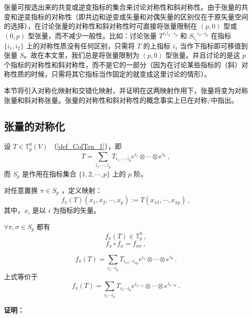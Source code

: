 


张量可按选出来的共变或逆变指标的集合来讨论对称性和斜对称性。由于张量的共变和逆变指标的对称性（即共边和逆变或矢量和对偶矢量的区别仅在于原矢量空间的选择），在讨论张量的对称性和斜对称性时可直接将张量限制在 $(p,0)$ 型或 $(0,p)$ 型张量，而不减少一般性。比如：讨论张量 $T^{i_1 i_2\cdots i_p}$ 和 ${S_{i_1}}^{i_2\cdots i_p}$ 在指标 $\{i_1,i_2\}$ 上的对称性质没有任何区别，只需将 $T$ 的上指标 $i_1$ 当作下指标即可移值到张量 $S$。故在本文里，我们总是将张量限制为 $(p,0)$ 型张量。并且讨论的是这 $p$ 个指标的对称性和斜对称性，而不是它的一部分（因为在讨论某些指标的（斜）对称性质的时候，只需将其它指标当作固定的就变成这里讨论的情形）。

本节将引入对称化映射和交错化映射，并证明在这两映射作用下，张量将变为对称张量和斜对称张量。张量的对称性和斜对称性的概念事实上已在对称/中指出。
\subsection{张量的对称化}
设 $T\in \mathbb{T}_p^0(V)$ （\autoref{def_CofTen_1}），即
\begin{equation}
T=\sum_{i_1,\cdots,i_p}T_{i_1,\cdots,i_p}e^{i_1}\otimes\cdots\otimes e^{i_p}~,
\end{equation}
而 $S_p$ 是作用在指标集合 $\{1,2,\cdots,p\}$ 上的 $p$ 阶。

对任意置换 $\pi\in S_p$ ，定义映射：
\begin{equation}\label{eq_SIofTe_1}
f_\pi(T)(x_1,x_2,\cdots,x_p):=T(x_{\pi1},\cdots,x_{\pi p})~,
\end{equation}
其中，$x_i$ 是以 $i$ 为指标的矢量。

\begin{theorem}{}
$\forall \pi,\sigma\in S_p$ 都有 
\begin{equation}
f_{\pi}(T)\in\mathbb{T}_p^0~,
\end{equation}
\begin{equation}\label{eq_SIofTe_6}
f_\pi \circ f_\sigma=f_{\pi\sigma}~,
\end{equation}

\begin{equation}\label{eq_SIofTe_2}
f_{\pi}(T)=\sum_{i_1\cdots i_p}T_{i_{\pi1}\cdots i_{\pi p}}e^{i_1}\otimes\cdots\otimes e^{i_p}~.
\end{equation}
上式等价于
\begin{equation}\label{eq_SIofTe_3}
f_{\pi}(T)=\sum_{i_1\cdots i_p}T_{i_1\cdots i_p}e^{i_{\pi^{-1}1}}\otimes\cdots\otimes e^{i_{\pi^{-1}p}}~.
\end{equation}
\end{theorem}
\textbf{证明：}

